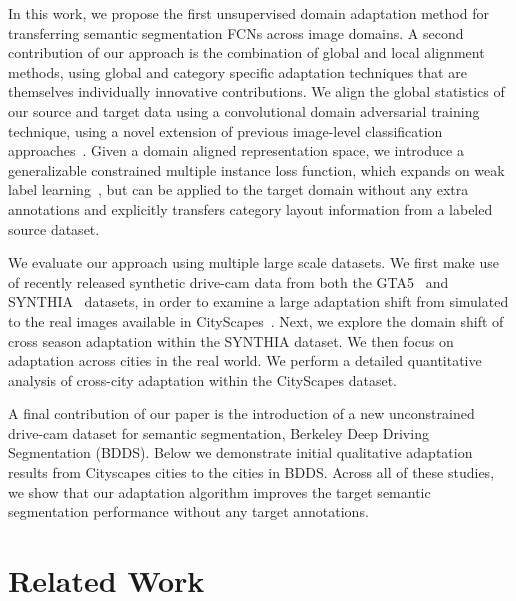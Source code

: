 \documentclass[10pt,twocolumn,letterpaper]{article}
\begin{document}
In this work, we propose the first unsupervised domain adaptation method for transferring semantic segmentation FCNs across image domains. 
A second contribution of our approach is the combination of global and local alignment methods, using global and category specific adaptation techniques that are themselves individually innovative contributions. 
We align the global statistics of our source and target data using a convolutional domain adversarial training technique, using a novel extension of previous image-level classification approaches~\cite{tzeng2015simultaneous,ganin2015unsupervised,ganin2016domain}.
Given a domain aligned representation space, we introduce a generalizable constrained multiple instance loss function, which expands on weak label learning~\cite{pathak2015fully,pathak2015constrained,pinheiro2015image,papandreou2015weakly,hong2015decoupled}, but can be applied to the target domain without any extra annotations and explicitly transfers category layout information from a labeled source dataset.



We evaluate our approach using multiple large scale datasets.
We first make use of recently released synthetic drive-cam data from both the GTA5~\cite{richter2016playing} and SYNTHIA~\cite{ros2016synthia} datasets, in order to examine a large adaptation shift from simulated to the real images available in CityScapes~\cite{cordts2016cityscapes}. Next, we explore the domain shift of cross season adaptation within the SYNTHIA dataset. We then focus on adaptation across cities in the real world. We perform a detailed quantitative analysis of cross-city adaptation within the CityScapes dataset. 

A final contribution of our paper is the  introduction of a new unconstrained drive-cam dataset for semantic segmentation, Berkeley Deep Driving Segmentation (BDDS). Below we demonstrate initial qualitative adaptation results from Cityscapes cities to the cities in BDDS.
Across all of these studies, we show that our adaptation algorithm improves the target semantic segmentation performance without any target annotations.






 \section{Related Work}
\label{sec:relatedwork}
\end{document}
